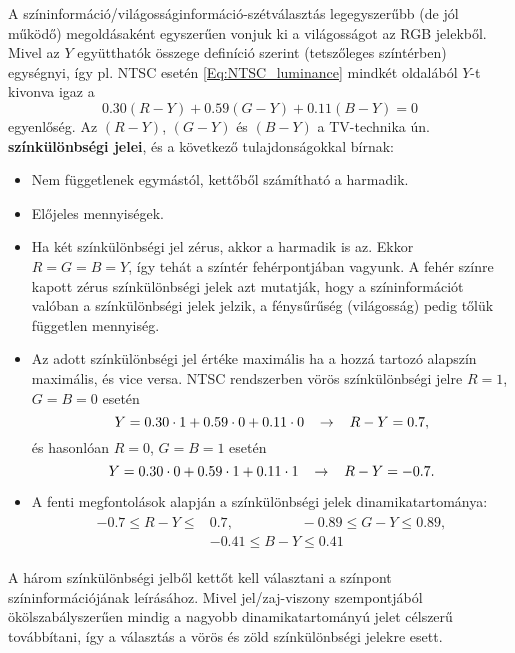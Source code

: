 A színinformáció/világosságinformáció-szétválasztás legegyszerűbb (de jól működő) megoldásaként egyszerűen vonjuk ki a világosságot az RGB jelekből.
Mivel az $Y$ együtthatók összege definíció szerint (tetszőleges színtérben) egységnyi, így pl. NTSC esetén \eqref{Eq:NTSC_luminance} mindkét oldalából $Y$-t kivonva igaz a 
\begin{equation} 
   0.30 ( R - Y ) + 0.59 ( G - Y )  + 0.11 ( B - Y )  = 0 
   \label{eq:chrominances}
\end{equation}
egyenlőség.
Az $ ( R - Y ) $, $ ( G - Y ) $ és $ ( B - Y ) $ a TV-technika ún. \textbf{színkülönbségi jelei}, és a következő tulajdonságokkal bírnak:
\begin{itemize}
\item Nem függetlenek egymástól, kettőből számítható a harmadik.
\item Előjeles mennyiségek.
\item Ha két színkülönbségi jel zérus, akkor a harmadik is az.
Ekkor $R = G = B = Y$, így tehát a színtér fehérpontjában vagyunk.
A fehér színre kapott zérus színkülönbségi jelek azt mutatják, hogy a színinformációt valóban a színkülönbségi jelek jelzik, a fénysűrűség (világosság) pedig tőlük független mennyiség.
\item Az adott színkülönbségi jel értéke maximális ha a hozzá tartozó alapszín maximális, és vice versa.
NTSC rendszerben vörös színkülönbségi jelre $R = 1$, $G = B= 0$ esetén
\begin{equation}
Y = 0.30 \cdot 1 + 0.59 \cdot 0 + 0.11 \cdot 0 \hspace{3mm }\rightarrow \hspace{3mm } R - Y  = 0.7,
\end{equation}
és hasonlóan $R=0$, $G = B = 1$ esetén
\begin{equation}
Y = 0.30 \cdot 0+ 0.59 \cdot 1 + 0.11 \cdot 1 \hspace{3mm }\rightarrow \hspace{3mm } R - Y  = -0.7.
\end{equation}
\item A fenti megfontolások alapján a színkülönbségi jelek dinamikatartománya:
\begin{align}
\begin{split}
-0.7 \leq R-Y \leq& 0.7 , \hspace{2cm} -0.89 \leq G-Y \leq 0.89, \\
 &-0.41 \leq B-Y \leq 0.41
\end{split}
\end{align}
\end{itemize}
A három színkülönbségi jelből kettőt kell választani a színpont színinformációjának leírásához.
Mivel jel/zaj-viszony szempontjából ökölszabályszerűen mindig a nagyobb dinamikatartományú jelet célszerű továbbítani, így a választás a vörös és zöld színkülönbségi jelekre esett.

